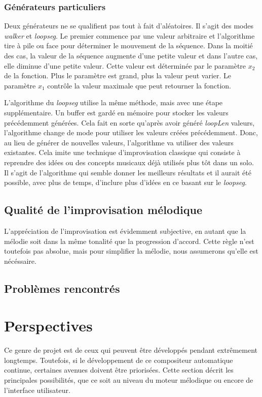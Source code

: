 \documentclass[letterpaper,12pt]{scrartcl}
\begin{document}
	\subsubsection{Générateurs particuliers}
	Deux générateurs ne se qualifient pas tout à fait d'aléatoires. Il s'agit des modes \textit{walker} et \textit{loopseg}. Le premier commence par une valeur arbitraire et l'algorithme tire à pile ou face pour déterminer le mouvement de la séquence. Dans la moitié des cas, la valeur de la séquence augmente d'une petite valeur et dans l'autre cas, elle diminue d'une petite valeur. Cette valeur est déterminée par le paramètre $x_2$ de la fonction. Plus le paramètre est grand, plus la valeur peut varier. Le paramètre $x_1$ contrôle la valeur maximale que peut retourner la fonction.
	
	L'algorithme du \textit{loopseg} utilise la même méthode, mais avec une étape supplémentaire. Un buffer est gardé en mémoire pour stocker les valeurs précédemment générées. Cela fait en sorte qu'après avoir généré \textit{loopLen} valeurs, l'algorithme change de mode pour utiliser  les valeurs créées précédemment. Donc, au lieu de générer de nouvelles valeurs, l'algorithme va utiliser des valeurs existantes. Cela imite une technique d'improvisation classique qui consiste à reprendre des idées ou des concepts musicaux déjà utilisés plus tôt dans un solo. Il s'agit de l'algorithme qui semble donner les meilleurs résultats et il aurait été possible, avec plus de temps, d'inclure plus d'idées en ce basant sur le \textit{loopseg}.
	
	\subsection{Qualité de l'improvisation mélodique}
	L'appréciation de l'improvisation est évidemment subjective, en autant que la mélodie soit dans la même tonalité que la progression d'accord. Cette règle n'est toutefois pas absolue, mais pour simplifier la mélodie, nous assumerons qu'elle est nécéssaire.
	\subsection{Problèmes rencontrés}
	
	\section{Perspectives}
	
	Ce genre de projet est de ceux qui peuvent être développés pendant extrêmement longtemps. Toutefois, si le développement de ce compositeur automatique continue, certaines avenues doivent être priorisées. Cette section décrit les principales possibilités, que ce soit au niveau du moteur mélodique ou encore de l'interface utilisateur.
	
\end{document}
